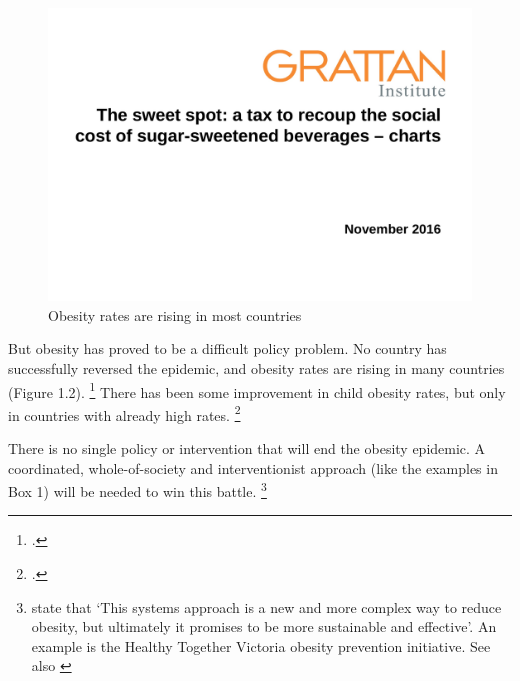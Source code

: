 \documentclass[embargoed]{grattan}
\begin{document}
\begin{figure}
\caption{Obesity rates are rising in most countries }

\includegraphics[page=3]{atlas/ObesityCharts}


\end{figure}

But obesity has proved to be a difficult policy problem.
No country has successfully reversed the epidemic, and obesity rates are rising in many countries (Figure 1.2).%
\footcites{Australia2015NoTimeWeight}{Roberto2015Patchyprogressobesity}{Swinburn2004Dietnutritionprevention} There has been some improvement in child obesity rates, but only in countries with already high rates.%
\footcite{Roberto2015Patchyprogressobesity}

There is no single policy or intervention that will end the obesity epidemic.
A coordinated, whole-of-society and interventionist approach (like the examples in Box 1) will be needed to win this battle.%
\footnote{\textcites{Sassi2016Taxingsugar}{Karnani2016ObesityCrisisas}{Huang2009systemsorientedmultilevel}\textcite{Swinburn2013Progressobesityprevention} state that `This systems approach is a new and more complex way to reduce obesity, but ultimately it promises to be more sustainable and effective'.
An example is the Healthy Together Victoria obesity prevention initiative.
See also \textcites{Mckinsey2014overcomingobesity}{Health2016Insufficientphysicalactivity}}
\end{document}
